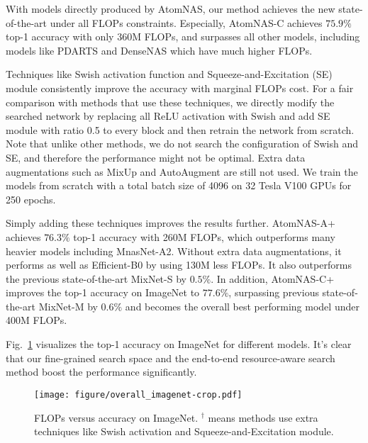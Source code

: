 \documentclass{article} \usepackage{iclr2020_conference,times}
\newcommand{\flops}{FLOPs\xspace}
\begin{document}
With models directly produced by AtomNAS, our method achieves the new state-of-the-art under all \flops constraints. Especially, AtomNAS-C achieves $75.9\%$ top-1 accuracy with only 360M \flops, and surpasses all other models, including models like PDARTS and DenseNAS which have much higher \flops.



Techniques like Swish activation function \citep{ramachandran2018swish} and Squeeze-and-Excitation (SE) module \citep{hu2018se} consistently improve the accuracy with marginal \flops cost. For a fair comparison with methods that use these techniques, we directly modify the searched network by replacing all ReLU activation with Swish and add SE module with ratio 0.5 to every block and then retrain the network from scratch. Note that unlike other methods, we do not search the configuration of Swish and SE, and therefore the performance might not be optimal. Extra data augmentations such as MixUp and AutoAugment are still not used. We train the models from scratch with a total batch size of 4096 on 32 Tesla V100 GPUs for 250 epochs. 


Simply adding these techniques improves the results further. AtomNAS-A+ achieves $76.3\%$ top-1 accuracy with 260M \flops, which outperforms many heavier models including MnasNet-A2. Without extra data augmentations, it performs as well as Efficient-B0 \citep{mingxing2019efficient} by using 130M less \flops. It also outperforms the previous state-of-the-art MixNet-S by $0.5\%$. In addition, AtomNAS-C+ improves the top-1 accuracy on ImageNet to $77.6\%$, surpassing previous state-of-the-art MixNet-M by $0.6\%$ and becomes the overall best performing model under 400M \flops.


Fig.~\ref{fig:overall_imagenet} visualizes the top-1 accuracy on ImageNet for different models. It's clear that our fine-grained search space and the end-to-end resource-aware search method boost the performance significantly.

\begin{figure}[t]
    \centering
    \texttt{[image: figure/overall\_imagenet-crop.pdf]}
    \caption{\flops versus accuracy on ImageNet. $^\dag$ means methods use extra techniques like Swish activation and Squeeze-and-Excitation module.}
    \label{fig:overall_imagenet}
\end{figure}
\end{document}
